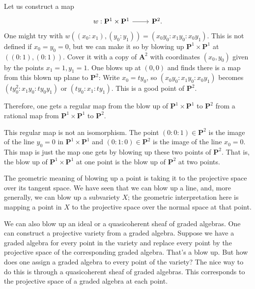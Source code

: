 \documentclass [11 pt, oneside] {article}
\begin{document}
\begin{example}[ ]\label{}\text{}
Let us construct a map 
\[
\begin{tikzcd}
w:\mathbf{P}^1\times \mathbf{P}^1\ar[r]& \mathbf{P}^2.
\end{tikzcd}
\] 
One might try with $w((x_0:x_1),(y_0:y_1)) = (x_0y_0:x_1y_0:x_0y_1)$. This is not defined if $x_0=y_0=0$, but we can make it so by blowing up $\mathbf{P}^1\times \mathbf{P}^1$ at $((0:1), (0:1) )$. Cover it with a copy of $\mathbf{A}^2$ with coordinates $(x_0,y_0)$ given by the points $x_1=1,y_1=1$. One blows up at $(0,0)$ and finds there is a map from this blown up plane to $\mathbf{P}^2$: Write $x_0=ty_0$, so $(x_0y_0:x_1y_0:x_0y_1)$ becomes $(ty_0^2:x_1y_0:ty_0y_1)$ or $(ty_0:x_1:ty_1)$. This is a good point of $\mathbf{P}^2$.

Therefore, one gets a regular map from the blow up of $\mathbf{P}^1\times \mathbf{P}^1$ to $\mathbf{P}^2$ from a rational map from $\mathbf{P}^1\times \mathbf{P}^1$ to $\mathbf{P}^2$.

\begin{remark}
	This regular map is not an isomorphism. The point $(0:0:1)\in  \mathbf{P}^2$ is the image of the line $y_0=0$ in $\mathbf{P}^1\times \mathbf{P}^1$ and $(0:1:0)\in \mathbf{P}^2$ is the image of the line $x_0=0$. This map is just the map one gets by blowing up these two points of $\mathbf{P}^2$. That is, the blow up of $\mathbf{P}^1\times \mathbf{P}^1$ at one point is the blow up of $\mathbf{P}^2$ at two points.
\end{remark}
\end{example}

The geometric meaning of blowing up a point is taking it to the projective space over its tangent space. We have seen that we can blow up a line, and, more generally, we can blow up a subvariety $X$; the geometric interpretation here is mapping a point in $X$ to the projective space over the normal space at that point. 

We can also blow up an ideal or a quasicoherent sheaf of graded algebras. One can construct a projective variety from a graded algebra. Suppose we have a graded algebra for every point in the variety and replace every point by the projective space of the corresponding graded algebra. That's a blow up. But how does one assign a graded algebra to every point of the variety? The nice way to do this is through a quasicoherent sheaf of graded algebras. This corresponds to the projective space of a graded algebra at each point.
\end{document}
